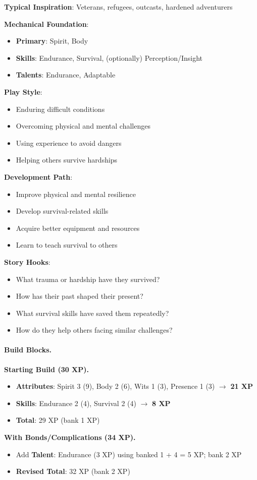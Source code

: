 \textbf{Typical Inspiration}: Veterans, refugees, outcasts, hardened adventurers

\textbf{Mechanical Foundation}:
\begin{itemize}
\item \textbf{Primary}: Spirit, Body
\item \textbf{Skills}: Endurance, Survival, (optionally) Perception/Insight
\item \textbf{Talents}: Endurance, Adaptable
\end{itemize}

\textbf{Play Style}:
\begin{itemize}
\item Enduring difficult conditions
\item Overcoming physical and mental challenges
\item Using experience to avoid dangers
\item Helping others survive hardships
\end{itemize}

\textbf{Development Path}:
\begin{itemize}
\item Improve physical and mental resilience
\item Develop survival-related skills
\item Acquire better equipment and resources
\item Learn to teach survival to others
\end{itemize}

\textbf{Story Hooks}:
\begin{itemize}
\item What trauma or hardship have they survived?
\item How has their past shaped their present?
\item What survival skills have saved them repeatedly?
\item How do they help others facing similar challenges?
\end{itemize}

\paragraph{Build Blocks.}
\textbf{Starting Build (30 XP).}
\begin{itemize}
\item \textbf{Attributes}: Spirit 3 (9), Body 2 (6), Wits 1 (3), Presence 1 (3) $\rightarrow$ \textbf{21 XP}
\item \textbf{Skills}: Endurance 2 (4), Survival 2 (4) $\rightarrow$ \textbf{8 XP}
\item \textbf{Total}: 29 XP (bank 1 XP)
\end{itemize}
\textbf{With Bonds/Complications (34 XP).}
\begin{itemize}
\item Add \textbf{Talent}: Endurance (3 XP) using banked 1 + 4 = 5 XP; bank 2 XP
\item \textbf{Revised Total}: 32 XP (bank 2 XP)
\end{itemize}

